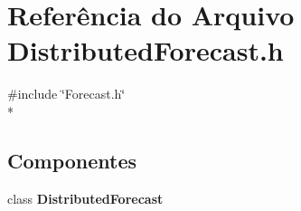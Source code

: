 \section{Referência do Arquivo Distributed\+Forecast.\+h}
\label{_distributed_forecast_8h}
{\ttfamily \#include \char`\"{}Forecast.\+h\char`\"{}}\\*
\subsection*{Componentes}
\begin{DoxyCompactItemize}
\item 
class {\bf Distributed\+Forecast}
\end{DoxyCompactItemize}
